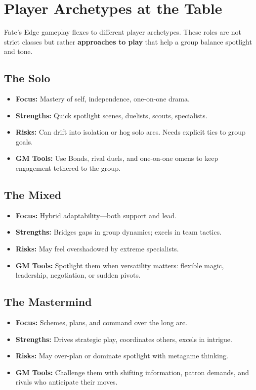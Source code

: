 

\section{Player Archetypes at the Table}
\label{sec:player-archetypes}

Fate’s Edge gameplay flexes to different player archetypes. These roles are not strict classes but rather \textbf{approaches to play} that help a group balance spotlight and tone.

\subsection{The Solo}
\begin{itemize}
  \item \textbf{Focus:} Mastery of self, independence, one-on-one drama.
  \item \textbf{Strengths:} Quick spotlight scenes, duelists, scouts, specialists.
  \item \textbf{Risks:} Can drift into isolation or hog solo arcs. Needs explicit ties to group goals.
  \item \textbf{GM Tools:} Use Bonds, rival duels, and one-on-one omens to keep engagement tethered to the group.
\end{itemize}

\subsection{The Mixed}
\begin{itemize}
  \item \textbf{Focus:} Hybrid adaptability—both support and lead.
  \item \textbf{Strengths:} Bridges gaps in group dynamics; excels in team tactics.
  \item \textbf{Risks:} May feel overshadowed by extreme specialists.
  \item \textbf{GM Tools:} Spotlight them when versatility matters: flexible magic, leadership, negotiation, or sudden pivots.
\end{itemize}

\subsection{The Mastermind}
\begin{itemize}
  \item \textbf{Focus:} Schemes, plans, and command over the long arc.
  \item \textbf{Strengths:} Drives strategic play, coordinates others, excels in intrigue.
  \item \textbf{Risks:} May over-plan or dominate spotlight with metagame thinking.
  \item \textbf{GM Tools:} Challenge them with shifting information, patron demands, and rivals who anticipate their moves.
\end{itemize}

